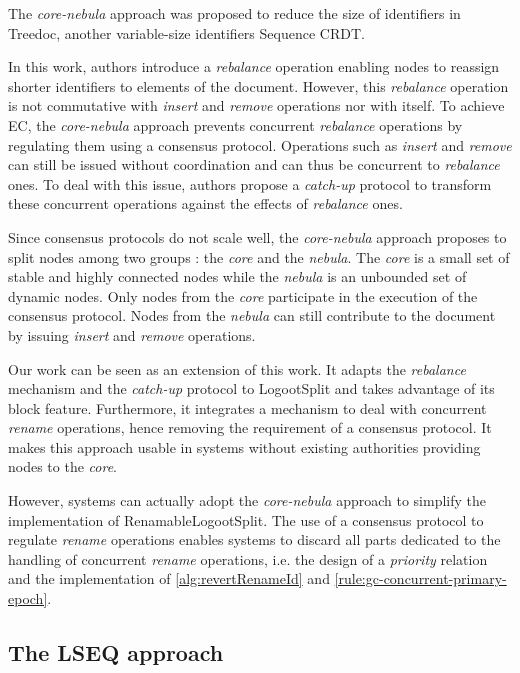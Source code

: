 \documentclass[sigplan,10pt]{acmart}
\newcommand{\ie}{i.e. }
\begin{document}
The \emph{core-nebula} approach \cite{letia:hal-01248270, zawirski:hal-01248197} was proposed to reduce the size of identifiers in Treedoc\cite{5158449}, another variable-size identifiers Sequence \ac{CRDT}.

In this work, authors introduce a \emph{rebalance} operation enabling nodes to reassign shorter identifiers to elements of the document.
However, this \emph{rebalance} operation is not commutative with \emph{insert} and \emph{remove} operations nor with itself.
To achieve \ac{EC}\cite{10.1145/224057.224070}, the \emph{core-nebula} approach prevents concurrent \emph{rebalance} operations by regulating them using a consensus protocol.
Operations such as \emph{insert} and \emph{remove} can still be issued without coordination and can thus be concurrent to \emph{rebalance} ones.
To deal with this issue, authors propose a \emph{catch-up} protocol to transform these concurrent operations against the effects of \emph{rebalance} ones.

Since consensus protocols do not scale well, the \emph{core-nebula} approach proposes to split nodes among two groups : the \emph{core} and the \emph{nebula}.
The \emph{core} is a small set of stable and highly connected nodes while the \emph{nebula} is an unbounded set of dynamic nodes.
Only nodes from the \emph{core} participate in the execution of the consensus protocol.
Nodes from the \emph{nebula} can still contribute to the document by issuing \emph{insert} and \emph{remove} operations.

Our work can be seen as an extension of this work.
It adapts the \emph{rebalance} mechanism and the \emph{catch-up} protocol to LogootSplit and takes advantage of its block feature.
Furthermore, it integrates a mechanism to deal with concurrent \emph{rename} operations, hence removing the requirement of a consensus protocol.
It makes this approach usable in systems without existing authorities providing nodes to the \emph{core}.

However, systems can actually adopt the \emph{core-nebula} approach to simplify the implementation of RenamableLogootSplit.
The use of a consensus protocol to regulate \emph{rename} operations enables systems to discard all parts dedicated to the handling of concurrent \emph{rename} operations, \ie the design of a \emph{priority} relation and the implementation of \autoref{alg:revertRenameId} and \autoref{rule:gc-concurrent-primary-epoch}.

\subsection{The LSEQ approach}
\end{document}
